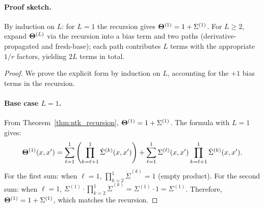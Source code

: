 \paragraph{Proof sketch.} By induction on \(L\): for \(L=1\) the recursion gives \(\boldsymbol{\Theta}^{(1)}=1+\Sigma^{(1)}\). For \(L\ge 2\), expand \(\boldsymbol{\Theta}^{(L)}\) via the recursion into a bias term and two paths (derivative-propagated and fresh-base); each path contributes \(L\) terms with the appropriate \(1/r\) factors, yielding \(2L\) terms in total.
\begin{proof}
\label{proof:general_L_ntk}
We prove the explicit form by induction on \( L \), accounting for the \( +1 \) bias terms in the recursion.

\paragraph{Base case \( L=1 \).}
From Theorem~\ref{thm:ntk_recursion}, \( \boldsymbol{\Theta}^{(1)} = 1 + \Sigma^{(1)} \). The formula with \( L=1 \) gives:
\begin{align}
\boldsymbol{\Theta}^{(1)}(x,x') = \sum_{\ell=1}^{1} \left(\prod_{k=\ell+1}^{1} \dot{\Sigma}^{(k)}(x,x')\right) + \sum_{\ell=1}^{1} \Sigma^{(\ell)}(x,x') \prod_{k=\ell+1}^{1} \dot{\Sigma}^{(k)}(x,x').
\end{align}
For the first sum: when \( \ell=1 \), \( \prod_{k=2}^{1} \dot{\Sigma}^{(k)} = 1 \) (empty product). For the second sum: when \( \ell=1 \), \( \Sigma^{(1)}\cdot\prod_{k=2}^{1} \dot{\Sigma}^{(k)} = \Sigma^{(1)}\cdot 1 = \Sigma^{(1)} \). Therefore, \( \boldsymbol{\Theta}^{(1)} = 1 + \Sigma^{(1)} \), which matches the recursion.


\end{proof}
